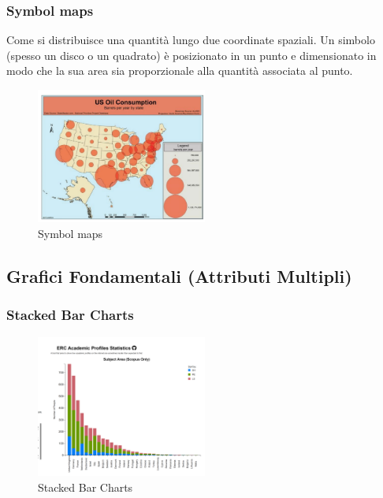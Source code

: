 \subsubsection{Symbol maps}
Come si distribuisce una quantità lungo due coordinate spaziali. Un simbolo (spesso un disco o un quadrato) è posizionato 
in un punto e dimensionato in modo che la sua area sia proporzionale alla quantità associata al punto.
\begin{figure}[H]
    \centering
    \includegraphics[width=0.5\textwidth]{images/SymbolMaps.png} 
    \caption{Symbol maps}
    \label{fig:immagine}
\end{figure}

\subsection{Grafici Fondamentali (Attributi Multipli)}
\subsubsection{Stacked Bar Charts}
\begin{figure}[H]
    \centering
    \includegraphics[width=0.5\textwidth]{images/StackedBar.png} %
    \caption{Stacked Bar Charts}
    \label{fig:immagine}
\end{figure}
